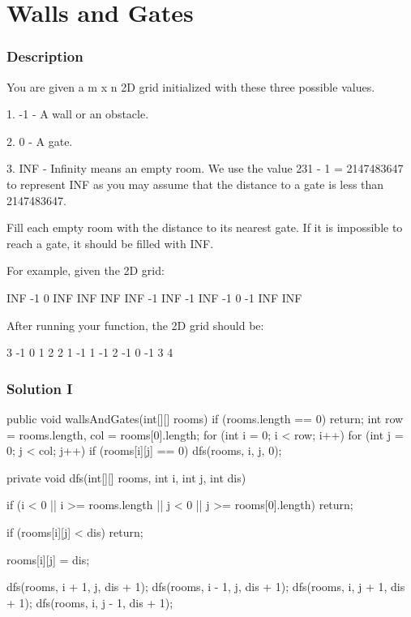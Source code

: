 \begin{Code}

\end{Code}

\newpage

\section{Walls and Gates} %

\subsubsection{Description}

You are given a m x n 2D grid initialized with these three possible values.

1. -1 - A wall or an obstacle.

2. 0 - A gate.

3. INF - Infinity means an empty room. We use the value 231 - 1 = 2147483647 to represent INF as you may assume that the distance to a gate is less than 2147483647.

Fill each empty room with the distance to its nearest gate. If it is impossible to reach a gate, it should be filled with INF.

For example, given the 2D grid:
\begin{Code}
INF  -1  0  INF
INF INF INF  -1
INF  -1 INF  -1
  0  -1 INF INF
\end{Code}

After running your function, the 2D grid should be:

\begin{Code}
3  -1   0   1
2   2   1  -1
1  -1   2  -1
0  -1   3   4
\end{Code}

\subsubsection{Solution I}

\begin{Code}
public void wallsAndGates(int[][] rooms) {
    if (rooms.length == 0) {
        return;
    }
    int row = rooms.length, col = rooms[0].length;
    for (int i = 0; i < row; i++) {
        for (int j = 0; j < col; j++) {
            if (rooms[i][j] == 0) {
                dfs(rooms, i, j, 0);
            }
        }
    }
}

private void dfs(int[][] rooms, int i, int j, int dis) {
    if (i < 0 || i >= rooms.length || j < 0 || j >= rooms[0].length) {
        return;
    }

    if (rooms[i][j] < dis) {
        return;
    }

    rooms[i][j] = dis;

    dfs(rooms, i + 1, j, dis + 1);
    dfs(rooms, i - 1, j, dis + 1);
    dfs(rooms, i, j + 1, dis + 1);
    dfs(rooms, i, j - 1, dis + 1);
}
\end{Code}

